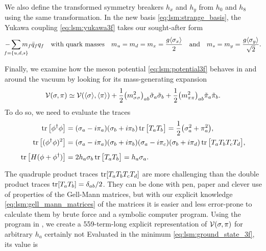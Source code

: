 We also define the transformed symmetry breakers $h_x$ and $h_y$ from $h_0$ and $h_8$ using the same transformation.
In the new basis \eqref{eq:lsm:strange_basis}, the Yukawa coupling \eqref{eq:lsm:yukawa3f} takes our sought-after form
\begin{equation}
	- \smashoperator{\sum_{f=\{u,d,s\}}} m_f \bar{q}_f q_f
	\quad \text{with quark masses} \quad
	m_u = m_d = m_x = \frac{g \avg{\sigma_x}}{2}
	\quad \text{and} \quad
	m_s = m_y = \frac{g \avg{\sigma_y}}{\sqrt{2}}.
\label{eq:lsm:quark_masses_3f}
\end{equation}

Finally, we examine how the meson potential \eqref{eq:lsm:potential3f} behaves in and around the vacuum
by looking for its mass-generating expansion
\begin{equation}
	\mathcal{V}(\sigma,\pi) \simeq \mathcal{V}(\langle \sigma \rangle,\langle \pi \rangle) + \frac12 \big(m^2_{\sigma\sigma}\big)_{ab} \tilde{\sigma}_a \tilde{\sigma}_b + \frac12 \big(m^2_{\pi\pi}\big)_{ab} \tilde{\pi}_a \tilde{\pi}_b.
\label{eq:lsm3f:potential_before_diagonalization}
\end{equation}
To do so, we need to evaluate the traces
\begin{subequations}
\begin{align}
	\operatorname{tr}\big[\phi^\dagger \phi\big]     &= (\sigma_a - i \pi_a) (\sigma_b + i \pi_b) \operatorname{tr} \big[ T_a T_b \big] = \frac12 \big(\sigma_a^2+\pi_a^2\big) , \\
	\operatorname{tr}\big[(\phi^\dagger \phi)^2\big] &= (\sigma_a - i \pi_a) (\sigma_b + i \pi_b) (\sigma_a - i \pi_c) (\sigma_b + i \pi_d) \operatorname{tr} \big[ T_a T_b T_c T_d \big], \\
	\operatorname{tr}\big[H(\phi+\phi^\dagger)\big]  &= 2 h_a \sigma_b \operatorname{tr} \big[ T_a T_b \big] = \vphantom{\frac12} h_a \sigma_a . \label{eq:lsm3f:traces_hphi}
\end{align}%
\label{eq:lsm3f:traces}%
\end{subequations}%
The quadruple product traces $\operatorname{tr}[T_a T_b T_c T_d]$ are more challenging than the double product traces $\operatorname{tr}[T_a T_b] = \delta_{ab}/2$.
They can be done with pen, paper and clever use of properties of the Gell-Mann matrices,
but with our explicit knowledge \eqref{eq:lsm:gell_mann_matrices} of the matrices
it is easier and less error-prone to calculate them by brute force and a symbolic computer program.
Using the program in ,
we create a 559-term-long explicit representation of $\mathcal{V}(\sigma,\pi)$ for arbitrary $h_a$ certainly not 
Evaluated in the minimum \eqref{eq:lsm:ground_state_3f}, its value is
